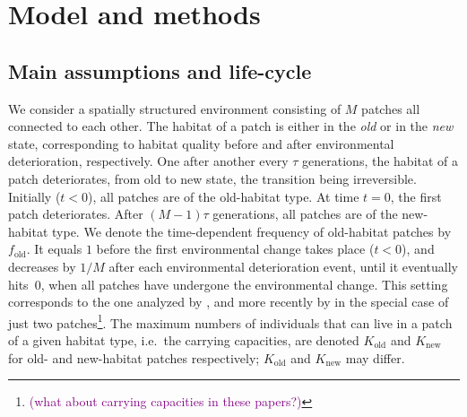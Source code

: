 \documentclass[11pt]{article}
\newcommand{\florence}[1]{\textcolor{purple}{(#1)}} %
\newcommand{\chg}[1]{\textcolor{change}{#1}}
\begin{document}
\section*{Model and methods}

\subsection*{Main assumptions and life-cycle}
We consider a spatially structured environment consisting of $M$ patches all connected to each other. The habitat of a patch is either in the \textit{old} or in the \textit{new} state, corresponding to habitat quality before and after environmental deterioration, respectively. One after \chg{another} every $\tau$ generations, the habitat of a patch deteriorates, from old to new state, the transition being irreversible. Initially ($t<0$), all patches are of the old-habitat type. At time $t=0$, the first patch deteriorates. After $(M-1)\tau$ generations, all patches are of the new-habitat type. We denote the time-dependent frequency of old-habitat patches by $f_{\text{old}}$. It equals $1$ before the first environmental change takes place ($t<0$), and decreases by $1/M$ after each environmental deterioration event, until it eventually hits~$0$, when all patches have undergone the environmental change. This setting corresponds to the one analyzed by \citet{uecker_2014}, and more recently by \citet{tomasini_2019} in the special case of just two patches\footnote{\florence{what about carrying capacities in these papers?}}. The maximum numbers of individuals that can live in a patch of a given habitat type, i.e.\ the carrying capacities, are denoted $K_{\text{old}}$ and $K_{\text{new}}$ for old- and new-habitat patches respectively; $K_{\text{old}}$ and $K_{\text{new}}$ may differ.
\end{document}
